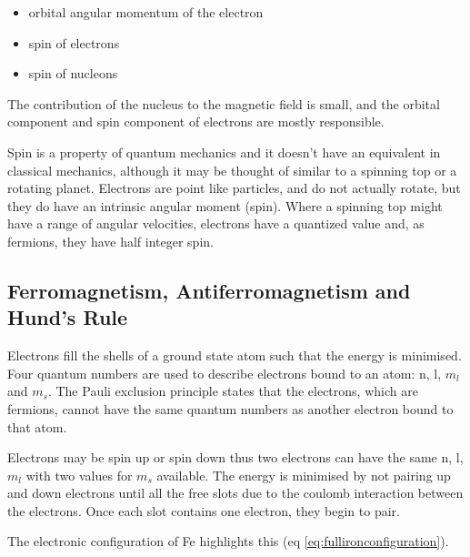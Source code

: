 \begin{itemize}
  \item orbital angular momentum of the electron
  \item spin of electrons
  \item spin of nucleons 
\end{itemize}

The contribution of the nucleus to the magnetic field is small, and the orbital component and spin component of electrons are mostly responsible.


Spin is a property of quantum mechanics and it doesn't have an equivalent in classical mechanics, although it may be thought of similar to a spinning top or a rotating planet.  Electrons are point like particles, and do not actually rotate, but they do have an intrinsic angular moment (spin).  Where a spinning top might have a range of angular velocities, electrons have a quantized value and, as fermions, they have half integer spin.  


\subsection{Ferromagnetism, Antiferromagnetism and Hund's Rule}
\label{section:hundsrule}

Electrons fill the shells of a ground state atom such that the energy is minimised.  Four quantum numbers are used to describe electrons bound to an atom: n, l, $m_l$ and $m_s$.  The Pauli exclusion principle states that the electrons, which are fermions, cannot have the same quantum numbers as another electron bound to that atom.

Electrons may be spin up or spin down thus two electrons can have the same n, l, $m_l$ with two values for $m_s$ available.  The energy is minimised by not pairing up and down electrons until all the free slots due to the coulomb interaction between the electrons.  Once each slot contains one electron, they begin to pair.

The electronic configuration of \Gls{Fe} highlights this (eq \ref{eq:fullironconfiguration}).


